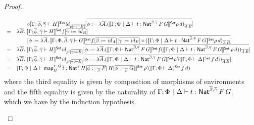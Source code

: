 \documentclass[acmsmall,review,anonymous]{acmart}
\theoremstyle{definition}
\renewcommand{\id}{\mathit{id}}
\newcommand{\map}{\mathsf{map}}
\begin{document}
\begin{proof}
\begin{itemize}
\[\begin{array}{ll}
&\hspace{2em}\circ
\setsem{\Gamma; \ol{\phi},\ol{\gamma} \vdash H}\id_{\rho[\ol{\gamma := B}]}
[\ol{\phi := \lambda \ol{A}. {(\setsem{\Gamma; \Phi~|~\Delta \vdash t : \Nat^{\ol{\beta},\ol{\gamma}}\,F\,G} \rho\, d)}_{\ol{A}\,\ol{B}}}] \\
=&
\lambda \ol{B}.\,
\setsem{\Gamma; \ol{\phi}, \ol{\gamma} \vdash H}
f[\ol{\gamma := \id_B}] \\
&\hspace{2em}[\ol{\phi := \lambda \ol{A}.\, \setsem{\Gamma; \Phi, \ol{\beta}, \ol{\gamma} \vdash G}f[\ol{\beta := \id_A}][\ol{\gamma := \id_B}]
\circ {(\setsem{\Gamma; \Phi~|~\Delta \vdash t : \Nat^{\ol{\beta},\ol{\gamma}}\,F\,G} \rho\, d)}_{\ol{A}\,\ol{B}}}] \\
=&
\lambda \ol{B}.\, 
\setsem{\Gamma; \ol{\phi},\ol{\gamma} \vdash H}\id_{\rho'[\ol{\gamma := B}]}
[\ol{\phi := \lambda \ol{A}. {(\setsem{\Gamma; \Phi \vdash \Nat^{\ol{\beta},\ol{\gamma}}\,F\,G} f (\setsem{\Gamma; \Phi~|~\Delta \vdash t : \Nat^{\ol{\beta},\ol{\gamma}}\,F\,G}\, \rho\, d ))}_{\ol{A}\,\ol{B}}}] \\
=&
\lambda \ol{B}.\, 
\setsem{\Gamma; \ol{\phi},\ol{\gamma} \vdash H}\id_{\rho'[\ol{\gamma := B}]}
[\ol{\phi := \lambda \ol{A}. {(\setsem{\Gamma; \Phi~|~\Delta \vdash t : \Nat^{\ol{\beta},\ol{\gamma}}\,F\,G} \rho' (\setsem{\Gamma; \Phi \vdash \Delta}\, f\, d ))}_{\ol{A}\,\ol{B}}}] \\
=&
\setsem{\Gamma; \Phi~|~\Delta \vdash
\map^{\ol{F},\ol{G}}_H\, \ol{t} :
\Nat^{\ol{\gamma}}\,H[\ol{\phi :=_{\ol{\beta}} F}]\,H[\ol{\phi
    :=_{\ol{\beta}} G}]}\,\rho'
(\setsem{\Gamma; \Phi \vdash \Delta}\, f\, d )
\end{array}
\]
where the third equality is given by composition of morphisms of environments
and the fifth equality is given by the naturality of $\Gamma; \Phi~|~\Delta \vdash t : \mathsf{Nat}^{\overline{\beta},\overline{\gamma}}\,F\,G$,
which we have by the induction hypothesis.


\end{itemize}
\end{proof}
\end{document}

